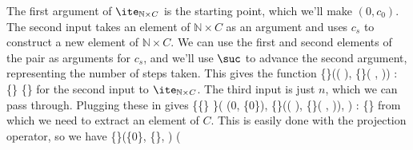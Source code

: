 The first argument of $\ite_{\mathbb{N} \times C}$ is the starting point,
which we'll make $(0, c_{0})$.  The second input takes an element of
$\mathbb{N} \times C$ as an argument and uses $c_{s}$ to construct a new
element of $\mathbb{N} \times C$.  We can use the first and second elements of
the pair as arguments for $c_{s}$, and we'll use $\suc$ to advance the second
argument, representing the number of steps taken.  This gives the function
  \{\}(( ), \{\}( ,  )) 
  : \{\}    \{\}  
for the second input to $\ite_{\mathbb{N} \times C}$.  The third input is just
$n$, which we can pass through.  Plugging these in gives
  \{\{\}  \}(
  (0, \{0\}),
  \{\}(( ), \{\}( ,  )),
  )
  : \{\}  
from which we need to extract an element of $C$.  This is easily done with the
projection operator, so we have
  \{\}(\{0\}, \{\}, ) 
  (
